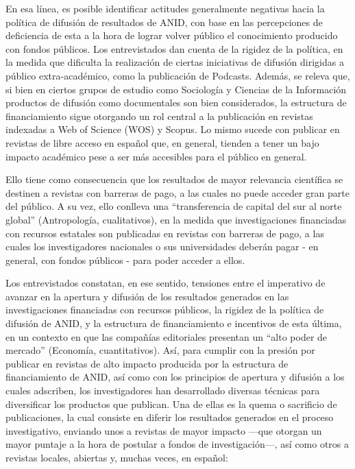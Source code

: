 \documentclass[
  letterpaper,
  DIV=11,
  numbers=noendperiod]{scrreprt}
\begin{document}
En esa línea, es posible identificar actitudes generalmente negativas
hacia la política de difusión de resultados de ANID, con base en las
percepciones de deficiencia de esta a la hora de lograr volver público
el conocimiento producido con fondos públicos. Los entrevistados dan
cuenta de la rigidez de la política, en la medida que dificulta la
realización de ciertas iniciativas de difusión dirigidas a público
extra-académico, como la publicación de Podcasts. Además, se releva que,
si bien en ciertos grupos de estudio como Sociología y Ciencias de la
Información productos de difusión como documentales son bien
considerados, la estructura de financiamiento sigue otorgando un rol
central a la publicación en revistas indexadas a Web of Science (WOS) y
Scopus. Lo mismo sucede con publicar en revistas de libre acceso en
español que, en general, tienden a tener un bajo impacto académico pese
a ser más accesibles para el público en general.

Ello tiene como consecuencia que los resultados de mayor relevancia
científica se destinen a revistas con barreras de pago, a las cuales no
puede acceder gran parte del público. A su vez, ello conlleva una
``transferencia de capital del sur al norte global'' (Antropología,
cualitativos), en la medida que investigaciones financiadas con recursos
estatales son publicadas en revistas con barreras de pago, a las cuales
los investigadores nacionales o sus universidades deberán pagar - en
general, con fondos públicos - para poder acceder a ellos.

Los entrevistados constatan, en ese sentido, tensiones entre el
imperativo de avanzar en la apertura y difusión de los resultados
generados en las investigaciones financiadas con recursos públicos, la
rigidez de la política de difusión de ANID, y la estructura de
financiamiento e incentivos de esta última, en un contexto en que las
compañías editoriales presentan un ``alto poder de mercado'' (Economía,
cuantitativos). Así, para cumplir con la presión por publicar en
revistas de alto impacto producida por la estructura de financiamiento
de ANID, así como con los principios de apertura y difusión a los cuales
adscriben, los investigadores han desarrollado diversas técnicas para
diversificar los productos que publican. Una de ellas es la quema o
sacrificio de publicaciones, la cual consiste en diferir los resultados
generados en el proceso investigativo, enviando unos a revistas de mayor
impacto ---que otorgan un mayor puntaje a la hora de postular a fondos
de investigación---, así como otros a revistas locales, abiertas y,
muchas veces, en español:
\end{document}
